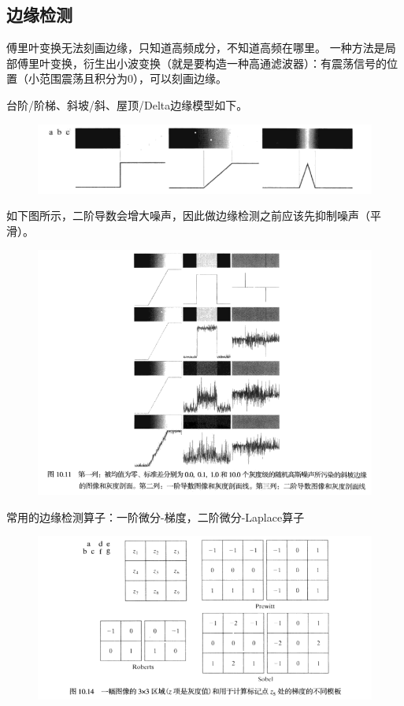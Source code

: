 \subsection{边缘检测}
傅里叶变换无法刻画边缘，只知道高频成分，不知道高频在哪里。
一种方法是局部傅里叶变换，衍生出小波变换（就是要构造一种高通滤波器）：有震荡信号的位置（小范围震荡且积分为0），可以刻画边缘。

台阶/阶梯、斜坡/斜、屋顶/Delta边缘模型如下。
\begin{figure}[H]
\centering
\includegraphics[width=0.9\linewidth]{fig/edge_model.png}
\end{figure}

如下图所示，二阶导数会增大噪声，因此做边缘检测之前应该先抑制噪声（平滑）。
\begin{figure}[H]
\centering
\includegraphics[width=0.9\linewidth]{fig/edge_detect_noise.png}
\end{figure}

常用的边缘检测算子：一阶微分-梯度，二阶微分-Laplace算子
\begin{figure}[H]
\centering
\includegraphics[width=0.9\linewidth]{fig/edge_detect_op.png}
\end{figure}

